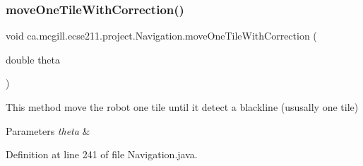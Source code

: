 \subsubsection{\texorpdfstring{move\+One\+Tile\+With\+Correction()}{moveOneTileWithCorrection()}}
{\footnotesize\ttfamily void ca.\+mcgill.\+ecse211.\+project.\+Navigation.\+move\+One\+Tile\+With\+Correction (\begin{DoxyParamCaption}\item[{double}]{theta }\end{DoxyParamCaption})}

This method move the robot one tile until it detect a blackline (ususally one tile) 
\begin{DoxyParams}{Parameters}
{\em theta} & \\
\hline
\end{DoxyParams}


Definition at line 241 of file Navigation.\+java.


